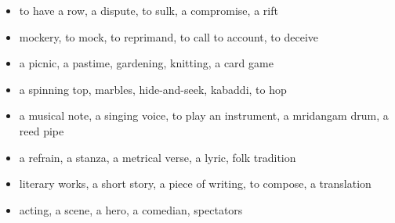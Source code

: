 \begin{itemize}
\raggedright
  \item to have a row, a dispute, to sulk, a compromise, a rift
  \item mockery, to mock, to reprimand, to call to account, to deceive
  \item a picnic, a pastime, gardening, knitting, a card game
  \item a spinning top, marbles, hide-and-seek, kabaddi, to hop
  \item a musical note, a singing voice, to play an instrument, a mridangam drum, a reed pipe
  \item a refrain, a stanza, a metrical verse, a lyric, folk tradition
  \item literary works, a short story, a piece of writing, to compose, a translation
  \item acting, a scene, a hero, a comedian, spectators
\end{itemize}

